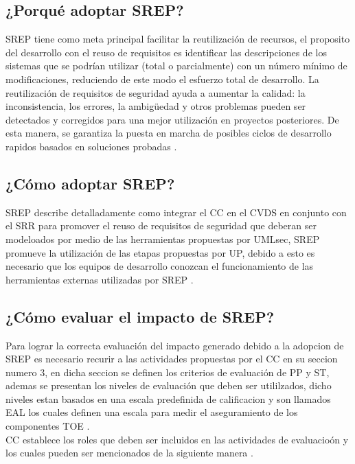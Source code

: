 \documentclass[runningheads,a4paper]{llncs}
\begin{document}
\subsection{¿Porqué adoptar \gls{SREP}?}

\gls{SREP} tiene como meta principal facilitar la reutilización de recursos, el proposito del desarrollo  con el reuso de requisitos es identificar las descripciones de los sistemas que se podrían utilizar (total o parcialmente) con un número mínimo de modificaciones, reduciendo de este modo el esfuerzo total de desarrollo. La reutilización de requisitos de seguridad ayuda a aumentar la calidad: la inconsistencia, los errores, la ambigüedad y otros problemas pueden ser detectados y corregidos para una mejor utilización en proyectos posteriores. De esta manera, se garantiza la puesta en marcha de posibles ciclos de desarrollo rapidos basados en soluciones probadas \cite{SREPMellado2}.

\subsection{¿Cómo adoptar \gls{SREP}?}
\gls{SREP} describe detalladamente como integrar el \gls{CC} en el \gls{CVDS} en conjunto con el \gls{SRR} para promover el reuso de requisitos de seguridad que deberan ser modeloados por medio de las herramientas propuestas por \gls{UMLsec}, \gls{SREP} promueve la utilización de las etapas propuestas por \gls{UP}, debido a esto es necesario que los equipos de desarrollo conozcan el funcionamiento de las herramientas externas utilizadas por \gls{SREP} \cite{SREPMellado2}. 

\subsection{¿Cómo evaluar el impacto de \gls{SREP}?}
Para lograr la correcta evaluación del impacto generado debido a la adopcion de \gls{SREP} es necesario recurir a las actividades propuestas por el \gls{CC} en su seccion numero 3, en dicha seccion se definen los criterios de evaluación de \gls{PP} y \gls{ST}, ademas se presentan los niveles de evaluación que deben ser utililzados, dicho niveles estan basados en una escala predefinida de calificacion y son llamados \gls{EAL} los cuales definen una escala para medir el aseguramiento de los componentes \gls{TOE} \cite{CCIntroduction}.\\

\gls{CC} establece los roles que deben ser incluidos en las actividades de evaluacioón y los cuales pueden ser mencionados de la siguiente manera \cite{CCIntroduction}.
\end{document}
